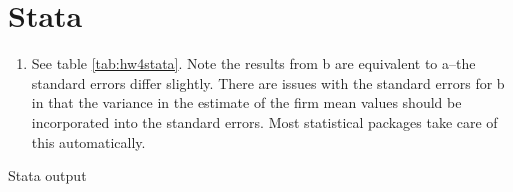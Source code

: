 \documentclass{article}
\begin{document}




\clearpage

\section{Stata}
\begin{enumerate}
    \item  See table \ref{tab:hw4stata}.  Note the results from b are equivalent to a--the standard errors differ slightly.  There are issues with the standard errors for b in that the variance in the estimate of the firm mean values should be incorporated into the standard errors.  Most statistical packages take care of this automatically.
\end{enumerate}

\begin{table}[h]
    \centering
    
    \caption{Stata output}
    \label{tab:hw4stata}
\end{table}
\end{document}
